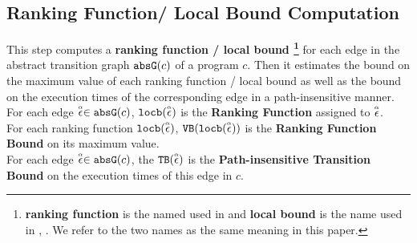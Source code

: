 \subsection{Ranking Function/ Local Bound Computation}
\label{sec:ranking}
This step computes a 
\textbf{ranking function / local bound
\footnote{\textbf{ranking function} is the named used in \cite{SinnZV14}
and \textbf{local bound} is the name used in \cite{ZulegerGSV11}, \cite{sinn2017complexity}.
We refer to the two names as the same meaning in this paper.}}
for each edge in the abstract transition graph $\mathtt{abs}{\mathtt{G}}(c)$ of a program $c$.
Then it estimates the bound on the maximum value of each ranking function / local bound as well as
the bound on the execution times of the corresponding edge in a path-insensitive manner.
\\
For each edge $\stackrel{\scriptscriptstyle{\alpha}}{\mathtt{\epsilon}{}} \in \mathtt{abs}{\mathtt{G}}(c)$,
$\mathtt{locb}(\stackrel{\scriptscriptstyle{\alpha}}{\mathtt{\epsilon}{}})$ is the \textbf{Ranking Function} assigned to $\stackrel{\scriptscriptstyle{\alpha}}{\mathtt{\epsilon}{}}$.
\\
For each ranking function $\mathtt{locb}(\stackrel{\scriptscriptstyle{\alpha}}{\mathtt{\epsilon}{}})$, ${\mathtt{VB}}(\mathtt{locb}(\stackrel{\scriptscriptstyle{\alpha}}{\mathtt{\epsilon}{}}))$ is
the \textbf{Ranking Function Bound} on its maximum value.
\\
For each edge $\stackrel{\scriptscriptstyle{\alpha}}{\mathtt{\epsilon}{}} \in \mathtt{abs}{\mathtt{G}}(c)$, the ${\mathtt{TB}}(\stackrel{\scriptscriptstyle{\alpha}}{\mathtt{\epsilon}{}})$ is the \textbf{Path-insensitive Transition Bound}
on the execution times of this edge in $c$.
